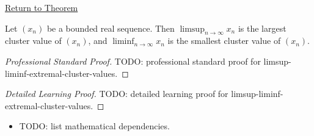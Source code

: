 \newpage
{}
\label{prf:limsup-liminf-extremal-cluster-values}

\begin{remark*}[Return]
\hyperref[thm:limsup-liminf-extremal-cluster-values]{Return to Theorem}
\end{remark*}

\begin{theorem*}
Let $(x_n)$ be a bounded real sequence. Then
$\limsup_{n\to\infty}x_n$ is the largest cluster value of $(x_n)$, and
$\liminf_{n\to\infty}x_n$ is the smallest cluster value of $(x_n)$.

\smallskip
\noindent
\end{theorem*}

\begin{proof}[Professional Standard Proof]
\LRAProofBodyStart
TODO: professional standard proof for limsup-liminf-extremal-cluster-values.
\end{proof}

\begin{proof}[Detailed Learning Proof]
\LRAProofBodyStart
TODO: detailed learning proof for limsup-liminf-extremal-cluster-values.
\end{proof}

\begin{remark*}
\end{remark*}

\begin{dependencies}
\begin{itemize}
  \item TODO: list mathematical dependencies.
\end{itemize}
\end{dependencies}

\clearpage
